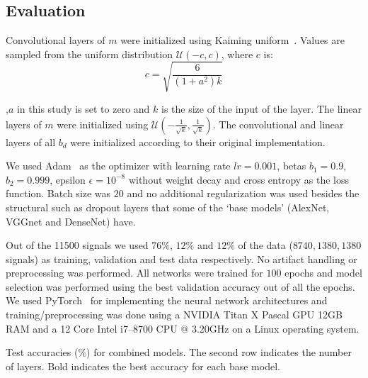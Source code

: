 \documentclass[conference]{IEEEtran}
\providecommand{\FILEPATH}{.}
\begin{document}
\subsection{Evaluation}
Convolutional layers of $m$ were initialized using Kaiming uniform~\cite{he2015delving}. Values are sampled from the uniform distribution $\mathcal{U}(-c, c)$, where $c$ is:
\begin{equation}
  c = \sqrt{\frac{6}{(1 + a^2) k}}
\end{equation}

\noindent
,$a$ in this study is set to zero and $k$ is the size of the input of the layer.
The linear layers of $m$ were initialized using $\mathcal{U}(-\frac{1}{\sqrt{k}},\frac{1}{\sqrt{k}})$.
The convolutional and linear layers of all $b_d$ were initialized according to their original implementation.

We used Adam~\cite{kingma2014adam} as the optimizer with learning rate $lr=0.001$, betas $b_1=0.9$, $b_2=0.999$, epsilon $\epsilon=10^{-8}$ without weight decay and cross entropy as the loss function.
Batch size was $20$ and no additional regularization was used besides the structural such as dropout layers that some of the `base models' (AlexNet, VGGnet and DenseNet) have.

Out of the 11500 signals we used $76\%$, $12\%$ and $12\%$ of the data ($8740,1380,1380$ signals) as training, validation and test data respectively.
No artifact handling or preprocessing was performed.
All networks were trained for $100$ epochs and model selection was performed using the best validation accuracy out of all the epochs.
We used PyTorch~\cite{paszke2017automatic} for implementing the neural network architectures and training/preprocessing was done using a NVIDIA Titan X Pascal GPU 12GB RAM and a 12 Core Intel i7--8700 CPU @ 3.20GHz on a Linux operating system.

\begin{table}[!t]
  \caption{Test accuracies (\%) for combined models.
    The second row indicates the number of layers.
  Bold indicates the best accuracy for each base model.}\label{table:results}
  \begin{adjustbox}{width=\textwidth}
    
  \end{adjustbox}
\end{table}
\end{document}
